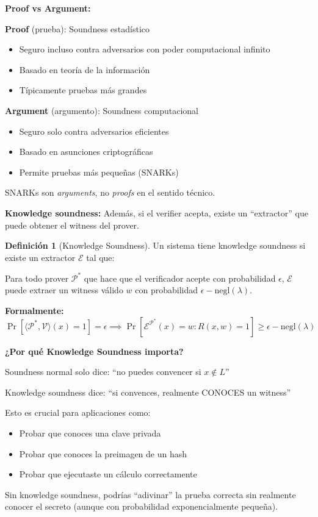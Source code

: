 \documentclass[11pt,a4paper,twoside,openright]{book}
\theoremstyle{definition}
\newtheorem{definition}{Definición}[chapter]
\theoremstyle{plain}
\theoremstyle{remark}
\begin{document}
\begin{mathnote}
\textbf{Proof vs Argument:}

\textbf{Proof} (prueba): Soundness estadístico
\begin{itemize}
    \item Seguro incluso contra adversarios con poder computacional infinito
    \item Basado en teoría de la información
    \item Típicamente pruebas más grandes
\end{itemize}

\textbf{Argument} (argumento): Soundness computacional
\begin{itemize}
    \item Seguro solo contra adversarios eficientes
    \item Basado en asunciones criptográficas
    \item Permite pruebas más pequeñas (SNARKs)
\end{itemize}

SNARKs son \textit{arguments}, no \textit{proofs} en el sentido técnico.
\end{mathnote}

\textbf{Knowledge soundness:} Además, si el verifier acepta, existe un ``extractor'' que puede obtener el witness del prover.

\begin{definition}[Knowledge Soundness]
Un sistema tiene knowledge soundness si existe un extractor $\mathcal{E}$ tal que:

Para todo prover $\mathcal{P}^*$ que hace que el verificador acepte con probabilidad $\epsilon$, $\mathcal{E}$ puede extraer un witness válido $w$ con probabilidad $\epsilon - \text{negl}(\lambda)$.

\textbf{Formalmente:}
\[ \Pr[\langle \mathcal{P}^*, \mathcal{V} \rangle(x) = 1] = \epsilon \implies \Pr[\mathcal{E}^{\mathcal{P}^*}(x) = w : R(x,w) = 1] \geq \epsilon - \text{negl}(\lambda) \]
\end{definition}

\begin{keyidea}
\textbf{¿Por qué Knowledge Soundness importa?}

Soundness normal solo dice: ``no puedes convencer si $x \notin L$''

Knowledge soundness dice: ``si convences, realmente CONOCES un witness''

Esto es crucial para aplicaciones como:
\begin{itemize}
    \item Probar que conoces una clave privada
    \item Probar que conoces la preimagen de un hash
    \item Probar que ejecutaste un cálculo correctamente
\end{itemize}

Sin knowledge soundness, podrías ``adivinar'' la prueba correcta sin realmente conocer el secreto (aunque con probabilidad exponencialmente pequeña).
\end{keyidea}
\end{document}
